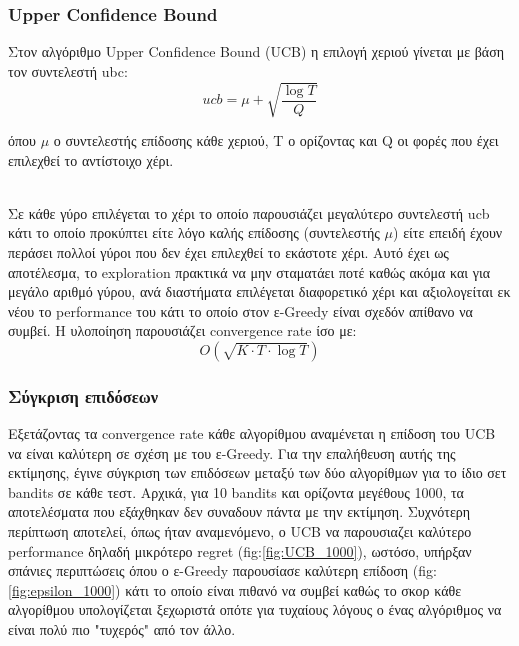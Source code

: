 \subsubsection*{Upper Confidence Bound}
\noindent
Στον αλγόριθμο Upper Confidence Bound (UCB) η επιλογή χεριού γίνεται με βάση τον συντελεστή ubc:
\begin{equation*}
	ucb = \mu + \sqrt{\frac{\log T}{Q} }
\end{equation*}

όπου $\mu$ ο συντελεστής επίδοσης κάθε χεριού, Τ ο ορίζοντας και Q οι φορές που έχει επιλεχθεί το αντίστοιχο χέρι.

\noindent\\
Σε κάθε γύρο επιλέγεται το χέρι το οποίο παρουσιάζει μεγαλύτερο συντελεστή ucb κάτι το οποίο προκύπτει είτε λόγο καλής επίδοσης (συντελεστής $\mu$) είτε επειδή έχουν περάσει πολλοί γύροι που δεν έχει επιλεχθεί το εκάστοτε χέρι. Αυτό έχει ως αποτέλεσμα, το exploration πρακτικά να μην σταματάει ποτέ καθώς ακόμα και για μεγάλο αριθμό γύρου, ανά διαστήματα επιλέγεται διαφορετικό χέρι και αξιολογείται εκ νέου το performance του κάτι το οποίο στον ε-Greedy είναι σχεδόν απίθανο να συμβεί.  Η υλοποίηση παρουσιάζει convergence rate ίσο με:
\begin{equation}
	O\left( \sqrt{K \cdot T \cdot \log T}\right)
\end{equation}


\subsubsection*{Σύγκριση επιδόσεων}

Εξετάζοντας τα convergence rate κάθε αλγορίθμου αναμένεται η επίδοση του UCB να είναι καλύτερη σε σχέση με του ε-Greedy. Για την επαλήθευση αυτής της εκτίμησης, έγινε σύγκριση των επιδόσεων μεταξύ των δύο αλγορίθμων για το ίδιο σετ bandits σε κάθε τεστ. Αρχικά, για 10 bandits και ορίζοντα μεγέθους 1000, τα αποτελέσματα που εξάχθηκαν δεν συναδουν πάντα με την εκτίμηση. Συχνότερη περίπτωση αποτελεί, όπως ήταν αναμενόμενο, ο UCB να παρουσιαζει καλύτερο performance δηλαδή μικρότερο regret (fig:\ref{fig:UCB_1000}), ωστόσο, υπήρξαν σπάνιες περιπτώσεις όπου ο ε-Greedy παρουσίασε καλύτερη επίδοση (fig:\ref{fig:epsilon_1000}) κάτι το οποίο είναι πιθανό να συμβεί καθώς το σκορ κάθε αλγορίθμου υπολογίζεται ξεχωριστά οπότε για τυχαίους λόγους ο ένας αλγόριθμος να είναι πολύ πιο "τυχερός" από τον άλλο. 

